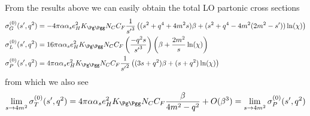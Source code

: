 From the results above we can easily obtain the total LO partonic cross sections
\begin{align}
\sigma_G^{(0)}(s',q^2) &=-4\pi\alpha\alpha_s e_H^2 K_{\Pg\Pgg}N_CC_F\frac 1 {{s'}^3}\left((s^2+q^4+4m^2 s)\beta + (s^2+q^4-4m^2(2m^2-s'))\ln(\chi)\right)\\
\sigma_L^{(0)}(s',q^2) &=16\pi\alpha\alpha_s e_H^2 K_{\Pg\Pgg}N_CC_F\left(\frac{-q^2s}{{s'}^3}\right)\left(\beta + \frac{2m^2}{s}\ln(\chi)\right)\\
\sigma_P^{(0)}(s',q^2) &=4\pi\alpha\alpha_s e_H^2 K_{\Pg\Pgg}N_CC_F\frac 1 {{s'}^2}\left((3s+q^2)\beta + (s+q^2)\ln(\chi)\right)
\end{align}
from which we also see
\begin{equation}
\lim_{s\rightarrow 4m^2} \sigma_T^{(0)}(s',q^2) = 4\pi\alpha\alpha_s e_H^2 K_{\Pg\Pgg}N_CC_F\frac{\beta}{4m^2-q^2} + O(\beta^3) = \lim_{s\rightarrow 4m^2} \sigma_P^{(0)}(s',q^2)
\end{equation}
